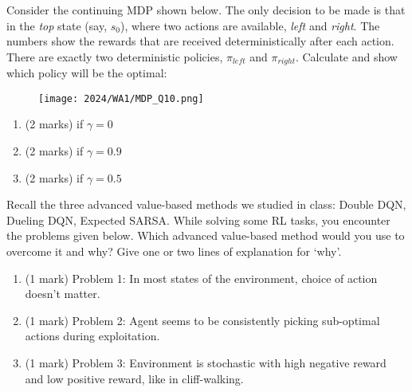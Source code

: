 \documentclass[addpoints,12pt,solution]{exam}
\begin{document}
\begin{questions}
\begin{solution}
\end{solution}

\question[6][MDP] Consider the continuing MDP shown below. The only decision
to be made is that in the \textit{top} state (say, $s_0$), where two actions are
available, \textit{left} and \textit{right}. The numbers show the rewards that are
received deterministically after each action. There are exactly two
deterministic policies, $\pi_{left}$ and $\pi_{right}$. Calculate and show which
policy will be the optimal:
\begin{figure}[!htp]
\texttt{[image: 2024/WA1/MDP\_Q10.png]}\centering
\end{figure}
\begin{enumerate}[label=(\alph*)]
    \item (2 marks) if $\gamma = 0$
    \begin{solution}
        
    \end{solution}
    \item (2 marks) if $\gamma = 0.9$
    \begin{solution}
        
    \end{solution}
    \item (2 marks) if $\gamma = 0.5$
    \begin{solution}
        
    \end{solution}
\end{enumerate}


\question[3] Recall the three advanced value-based methods we studied in class: Double DQN, Dueling DQN, Expected SARSA.
While solving some RL tasks, you encounter the problems given below. Which advanced value-based method would you use to overcome it and why? Give one or two lines of explanation for `why’.
\begin{enumerate}[label=(\alph*)]
    \item (1 mark) Problem 1: In most states of the environment, choice of action doesn’t matter.
    \begin{solution}

    \end{solution}
    \item (1 mark) Problem 2: Agent seems to be consistently picking sub-optimal actions during exploitation.
    \begin{solution}
 
    \end{solution}
    \item (1 mark) Problem 3: Environment is stochastic with high negative reward and low positive reward, like in cliff-walking.
    \begin{solution}
    

\end{solution}
\end{enumerate}
\end{questions}
\end{document}
